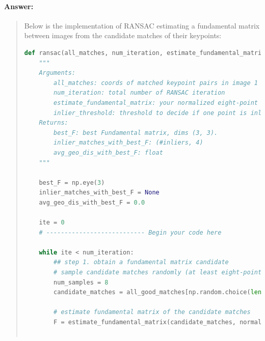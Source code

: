 \documentclass[11pt]{article}
\begin{document}
\paragraph{Answer:} 
\begin{quote}

Below is the implementation of RANSAC estimating a fundamental matrix between images from the candidate matches of their keypoints:

\begin{lstlisting}[language=Python, basicstyle=\scriptsize]
def ransac(all_matches, num_iteration, estimate_fundamental_matrix, inlier_threshold):
    """
    Arguments:
        all_matches: coords of matched keypoint pairs in image 1 and 2, dims (# matches, 4).
        num_iteration: total number of RANSAC iteration
        estimate_fundamental_matrix: your normalized eight-point algorithm function
        inlier_threshold: threshold to decide if one point is inlier
    Returns:
        best_F: best Fundamental matrix, dims (3, 3).
        inlier_matches_with_best_F: (#inliers, 4)
        avg_geo_dis_with_best_F: float
    """

    best_F = np.eye(3)
    inlier_matches_with_best_F = None
    avg_geo_dis_with_best_F = 0.0

    ite = 0
    # --------------------------- Begin your code here

    while ite < num_iteration:
        ## step 1. obtain a fundamental matrix candidate
        # sample candidate matches randomly (at least eight-points are needed)
        num_samples = 8
        candidate_matches = all_good_matches[np.random.choice(len(all_good_matches), num_samples)]
        
        # estimate fundamental matrix of the candidate matches
        F = estimate_fundamental_matrix(candidate_matches, normalize=True)
        

\end{lstlisting}
\end{quote}
\end{document}
